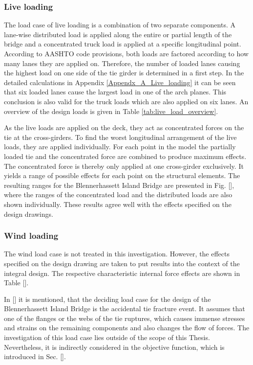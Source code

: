 \subsubsection{Live loading}
The load case of live loading is a combination of two separate components. A lane-wise distributed load is applied along the entire or partial length of the bridge and a concentrated truck load is applied at a specific longitudinal point. According to AASHTO code provisions, both loads are factored according to how many lanes they are applied on. Therefore, the number of loaded lanes causing the highest load on one side of the tie girder is determined in a first step. In the detailed calculations in Appendix \ref{Appendx_A_Live_loading} it can be seen that six loaded lanes cause the largest load in one of the arch planes. This conclusion is also valid for the truck loads which are also applied on six lanes. An overview of the design loads is given in Table \ref{tab:live_load_overview}. 



As the live loads are applied on the deck, they act as concentrated forces on the tie at the cross-girders. To find the worst longitudinal arrangement of the live loads, they are applied individually. For each point in the model the partially loaded tie and the concentrated force are combined to produce maximum effects. The concentrated force is thereby only applied at one cross-girder exclusively. It yields a range of possible effects for each point on the structural elements. The resulting ranges for the Blennerhassett Island Bridge are presented in Fig. [], where the ranges of the concentrated load and the distributed loads are also shown individually. These results agree well with the effects specified on the design drawings.


\subsubsection{Wind loading}
The wind load case is not treated in this investigation. However, the effects specified on the design drawing are taken to put results into the context of the integral design. The respective characteristic internal force effects are shown in Table [].

In [] it is mentioned, that the deciding load case for the design of the Blennerhassett Island Bridge is the accidental tie fracture event. It assumes that one of the flanges or the webs of the tie ruptures, which causes immense stresses and strains on the remaining components and also changes the flow of forces. The investigation of this load case lies outside of the scope of this Thesis. Nevertheless, it is indirectly considered in the objective function, which is introduced in Sec. [].


